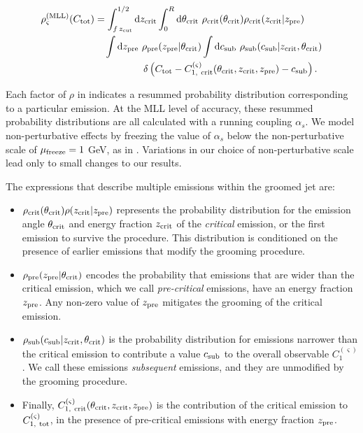 \begin{equation}
\begin{aligned}
    \rho^{\rm (MLL)}_\varsigma(C_{\rm tot})
    &=
    \int_{f\,\zcut}^{1/2} \dd \zcrit
    \int_0^R \dd \thetacrit
    ~
    \rho_{\rm crit}(\thetacrit)
    \rho_{\rm crit}(\zcrit | \zpre)
    \\
    &~~~
    \int \dd \zpre
    ~
    \rho_{\rm pre}(\zpre|\thetacrit)
    \int \dd c_{\rm sub}
    ~
    \rho_{\rm sub}(c_{\rm sub}|\zcrit,\thetacrit)
    \\
    &~~~~~~~~~~~~~~~
    \delta\left(
        C_{\rm tot}
        -
        C^{(\varsigma)}_{1,~\rm crit}
        (\thetacrit, \zcrit, \zpre)
        -
        c_{\rm sub}
    \right)
    \label{eq:convolution}
    .
\end{aligned}
\end{equation}

Each factor of \(\rho\) in  indicates a resummed probability distribution corresponding to a particular emission.
%
At the MLL level of accuracy, these resummed probability distributions are all calculated with a running coupling \(\alpha_s\).
%
We model non-perturbative effects by freezing the value of \(\alpha_s\) below the non-perturbative scale of \(\mu_{\rm freeze} = 1\) GeV, as in .
%
Variations in our choice of non-perturbative scale lead only to small changes to our results.


The expressions that describe multiple emissions within the groomed jet are:
\begin{itemize}
\item
\(\rho_{\rm crit}(\theta_{\rm crit}) \rho(z_{\rm crit} | z_{\rm pre})\) represents the probability distribution for the emission angle \(\theta_{\rm crit}\) and energy fraction \(z_{\rm crit}\) of the \textit{critical} emission, or the first emission to survive the  procedure.
%
This distribution is conditioned on the presence of earlier emissions that modify the grooming procedure.

\item
\(\rho_{\rm pre}(z_{\rm pre} | \theta_{\rm crit})\) encodes the probability that emissions that are wider than the critical emission, which we call \textit{pre-critical} emissions, have an energy fraction \(z_{\rm pre}\).
%
%
Any non-zero value of \(z_{\rm pre}\) mitigates the grooming of the critical emission.

\item
\(\rho_{\rm sub}(c_{\rm sub} | z_{\rm crit}, \theta_{\rm crit})\) is the probability distribution for emissions narrower than the critical emission to contribute a value \(c_{\rm sub}\) to the overall observable \(C^{(\varsigma)}_1\).
%
We call these emissions \textit{subsequent} emissions, and they are unmodified by the grooming procedure.

\item
Finally, \(C^{(\varsigma)}_{1,~\rm crit}(\theta_{\rm crit},z_{\rm crit},z_{\rm pre})\) is the contribution of the critical emission to \(C^{(\varsigma)}_{1,~\rm tot}\), in the presence of pre-critical emissions with energy fraction \(z_{\rm pre}\).
\end{itemize}

